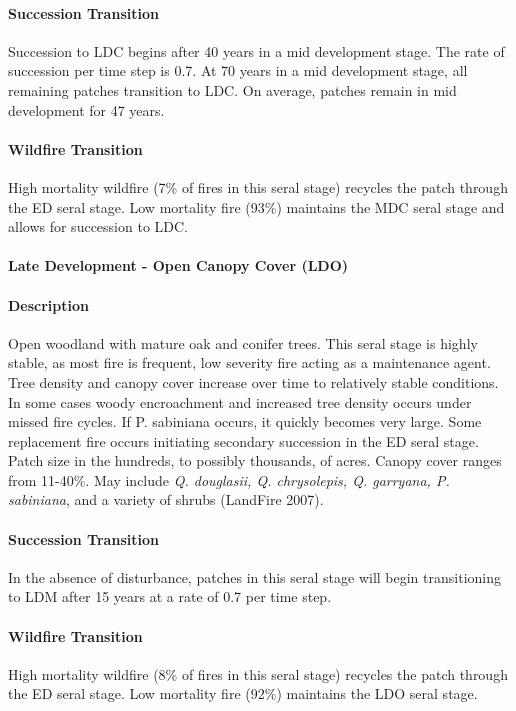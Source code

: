 \paragraph{Succession Transition} Succession to LDC begins after 40 years in a mid development stage. The rate of succession per time step is 0.7. At 70 years in a mid development stage, all remaining patches transition to LDC. On average, patches remain in mid development for 47 years.

\paragraph{Wildfire Transition} High mortality wildfire (7\% of fires in this seral stage) recycles the patch through the ED seral stage. Low mortality fire (93\%) maintains the MDC seral stage and allows for succession to LDC.

\noindent\hrulefill


\paragraph{Late Development - Open Canopy Cover (LDO)}

\paragraph{Description} Open woodland with mature oak and conifer trees. This seral stage is highly stable, as most fire is frequent, low severity fire acting as a maintenance agent. Tree density and canopy cover increase over time to relatively stable conditions. In some cases woody encroachment and increased tree density occurs under missed fire cycles. If P. sabiniana occurs, it quickly becomes very large. Some replacement fire occurs initiating secondary succession in the ED seral stage. Patch size in the hundreds, to possibly thousands, of acres. Canopy cover ranges from 11-40\%. May include \emph{Q. douglasii, Q. chrysolepis, Q. garryana, P. sabiniana}, and a variety of shrubs (LandFire 2007).

\paragraph{Succession Transition} In the absence of disturbance, patches in this seral stage will begin transitioning to LDM after 15 years at a rate of 0.7 per time step. 

\paragraph{Wildfire Transition} High mortality wildfire (8\% of fires in this seral stage) recycles the patch through the ED seral stage. Low mortality fire (92\%) maintains the LDO seral stage.

